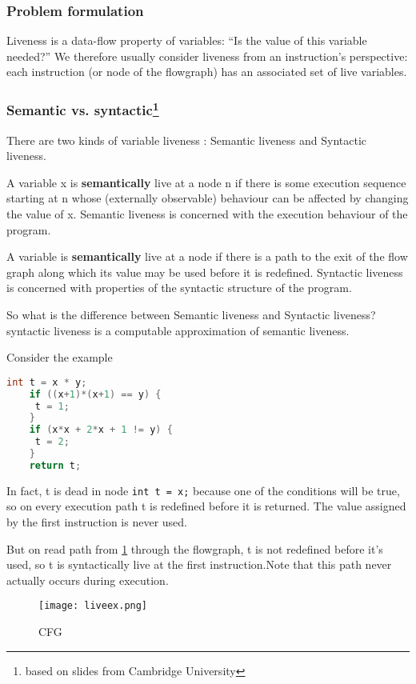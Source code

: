 \subsubsection{Problem formulation}
Liveness is a data-flow property of variables:
“Is the value of this variable needed?” We therefore 
usually consider liveness from an instruction's 
perspective: each instruction (or node of the
flowgraph) has an associated set of live variables.


\subsubsection{Semantic vs. syntactic\footnote{based on slides from Cambridge University}}


There are two kinds of variable liveness : Semantic liveness and Syntactic liveness.


A variable x is \textbf{semantically} live at a node n if there is
some execution sequence starting at n whose (externally
observable) behaviour can be affected by changing the
value of x. Semantic liveness is concerned with
the execution behaviour of the program.

A variable is \textbf{semantically} live at a node if there is a
path to the exit of the flow graph along which its
value may be used before it is redefined. Syntactic liveness is concerned with properties of
the syntactic structure of the program.


So what is the difference between Semantic liveness and Syntactic liveness? syntactic liveness
is a computable approximation of semantic liveness.


Consider the example 


\begin{lstlisting}[language=C,frame=single, caption=An ,label = lst:expr2]
    int t = x * y;
    if ((x+1)*(x+1) == y) {
     t = 1;
    }
    if (x*x + 2*x + 1 != y) {
     t = 2;
    }
    return t;
\end{lstlisting}

In fact, t is dead in node \texttt{int t = x;} because one of the conditions will be true, 
so on every execution path t is redefined before it is returned.
The value assigned by the first instruction is never used.


But on read path from \ref{fig:liveex} through the
flowgraph, t is not
redefined before it's used,
so t is syntactically live at
the first instruction.Note that this path never
actually occurs during
execution.

\begin{figure}[h]
    \centering
    \texttt{[image: liveex.png]}
    \caption{CFG}
    \label{fig:liveex}
\end{figure}